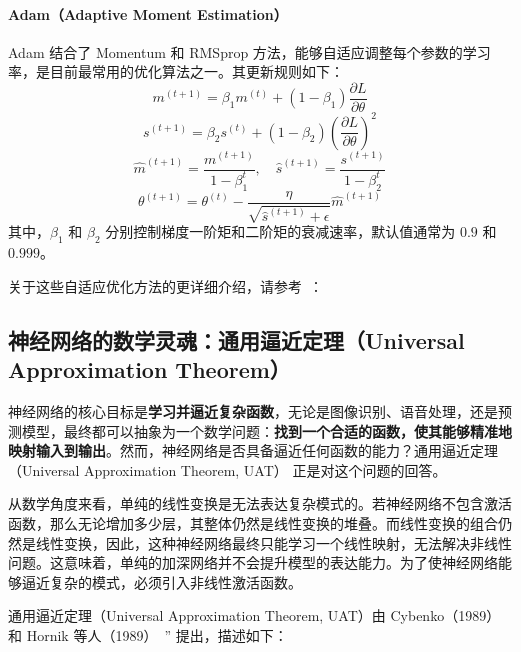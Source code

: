 \paragraph*{Adam（Adaptive Moment Estimation）}
Adam 结合了 Momentum 和 RMSprop 方法，能够自适应调整每个参数的学习率，是目前最常用的优化算法之一。其更新规则如下：
\begin{equation}
m^{(t+1)} = \beta_1 m^{(t)} + (1-\beta_1) \frac{\partial L}{\partial \theta}
\end{equation}
\begin{equation}
s^{(t+1)} = \beta_2 s^{(t)} + (1-\beta_2) \left(\frac{\partial L}{\partial \theta} \right)^2
\end{equation}
\begin{equation}
\hat{m}^{(t+1)} = \frac{m^{(t+1)}}{1 - \beta_1^t}, \quad \hat{s}^{(t+1)} = \frac{s^{(t+1)}}{1 - \beta_2^t}
\end{equation}
\begin{equation}
\theta^{(t+1)} = \theta^{(t)} - \frac{\eta}{\sqrt{\hat{s}^{(t+1)} + \epsilon}} \hat{m}^{(t+1)}
\end{equation}
其中，\( \beta_1 \) 和 \( \beta_2 \) 分别控制梯度一阶矩和二阶矩的衰减速率，默认值通常为 \(0.9\) 和 \(0.999\)。

关于这些自适应优化方法的更详细介绍，请参考~\cite{kingma2014adam,bengio2012practical}：


\subsection{ 神经网络的数学灵魂：通用逼近定理（Universal Approximation Theorem）}

神经网络的核心目标是{\bf 学习并逼近复杂函数}，无论是图像识别、语音处理，还是预测模型，最终都可以抽象为一个数学问题：{\bf 找到一个合适的函数，使其能够精准地映射输入到输出}。然而，神经网络是否具备逼近任何函数的能力？通用逼近定理（Universal Approximation Theorem, UAT） 正是对这个问题的回答。

从数学角度来看，单纯的线性变换是无法表达复杂模式的。若神经网络不包含激活函数，那么无论增加多少层，其整体仍然是线性变换的堆叠。而线性变换的组合仍然是线性变换，因此，这种神经网络最终只能学习一个线性映射，无法解决非线性问题。这意味着，单纯的加深网络并不会提升模型的表达能力。为了使神经网络能够逼近复杂的模式，必须引入非线性激活函数。

通用逼近定理（Universal Approximation Theorem, UAT）由 Cybenko（1989） 和 Hornik 等人（1989）~\cite{hornik1990universal, cybenko1989approximation,}” 提出，描述如下：

